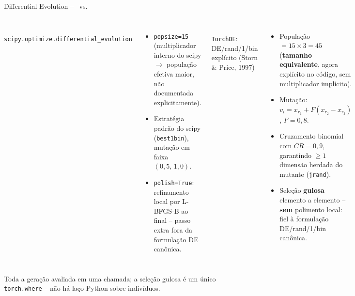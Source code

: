 \begin{frame}{Differential Evolution -- \antes\ vs. \depois}
  \begin{columns}[T,onlytextwidth]
      \antes\\[0.3em]
      \small \texttt{scipy.optimize.differential\_evolution}
      \begin{itemize}\footnotesize
        \item \texttt{popsize=15} (multiplicador interno do scipy $\to$
          população efetiva maior, não documentada explicitamente).
        \item Estratégia padrão do scipy (\texttt{best1bin}), mutação em
          faixa $(0{,}5,\,1{,}0)$.
        \item \texttt{polish=True}: refinamento local por L-BFGS-B ao final
          -- passo extra fora da formulação DE canônica.
      \end{itemize}
      \depois\\[0.3em]
      \small \texttt{TorchDE}: DE/rand/1/bin explícito (Storn \& Price, 1997)
      \begin{itemize}\footnotesize
        \item População $=15\times3=45$ (\textbf{tamanho equivalente},
          agora explícito no código, sem multiplicador implícito).
        \item Mutação: $v_i = x_{r_1} + F(x_{r_2}{-}x_{r_3})$, $F=0{,}8$.
        \item Cruzamento binomial com $CR=0{,}9$, garantindo $\geq1$
          dimensão herdada do mutante (\texttt{jrand}).
        \item Seleção \textbf{gulosa} elemento a elemento -- \textbf{sem}
          polimento local: fiel à formulação DE/rand/1/bin canônica.
      \end{itemize}
  \end{columns}
  \vspace{0.6em}

  \small Toda a geração avaliada em uma chamada; a seleção gulosa é um
  único \texttt{torch.where} -- não há laço Python sobre indivíduos.

\end{frame}
